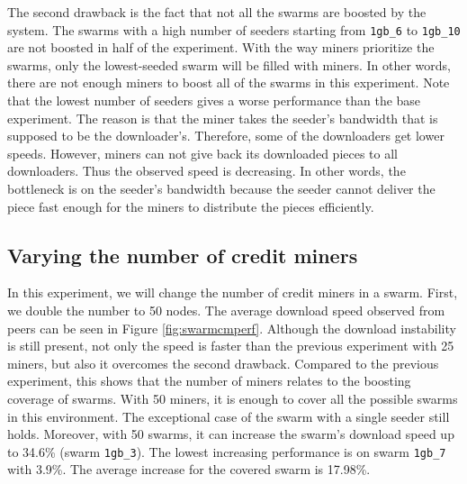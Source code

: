 The second drawback is the fact that not all the swarms are boosted by the system. The swarms with a high number of seeders starting from \texttt{1gb\_6} to \texttt{1gb\_10} are not boosted in half of the experiment. With the way miners prioritize the swarms, only the lowest-seeded swarm will be filled with miners. In other words, there are not enough miners to boost all of the swarms in this experiment. Note that the lowest number of seeders gives a worse performance than the base experiment. The reason is that the miner takes the seeder's bandwidth that is supposed to be the downloader's. Therefore, some of the downloaders get lower speeds. However, miners can not give back its downloaded pieces to all downloaders. Thus the observed speed is decreasing. In other words, the bottleneck is on the seeder's bandwidth because the seeder cannot deliver the piece fast enough for the miners to distribute the pieces efficiently.

\subsection{Varying the number of credit miners}
In this experiment, we will change the number of credit miners in a swarm. First, we double the number to 50 nodes. The average download speed observed from peers can be seen in Figure \ref{fig:swarmcmperf}. Although the download instability is still present, not only the speed is faster than the previous experiment with 25 miners, but also it overcomes the second drawback. Compared to the previous experiment, this shows that the number of miners relates to the boosting coverage of swarms. With 50 miners, it is enough to cover all the possible swarms in this environment. The exceptional case of the swarm with a single seeder still holds. Moreover, with 50 swarms, it can increase the swarm's download speed up to 34.6\% (swarm \texttt{1gb\_3}). The lowest increasing performance is on swarm \texttt{1gb\_7} with 3.9\%. The average increase for the covered swarm is 17.98\%.

